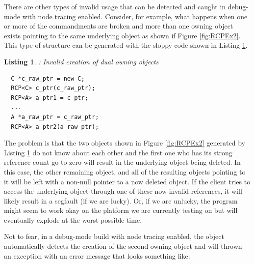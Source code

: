 \documentclass[pdf,ps2pdf,11pt]{SANDreport}
\newtheorem{listing}{Listing}
\begin{document}
There are other types of invalid usage that can be detected and caught
in debug-mode with node tracing enabled.  Consider, for example, what
happens when one or more of the commandments are broken and more than
one owning {} object exists pointing to the same
underlying {} object as shown if Figure
{}\ref{fig:RCPEx2}.  This type of structure can be generated with the
sloppy code shown in Listing {}\ref{listing:duplicate_owning_rcp}.

{}\begin{listing}: Invalid creation of dual owning {}
objects
\label{listing:duplicate_owning_rcp}
{\small\begin{verbatim}
  C *c_raw_ptr = new C;
  RCP<C> c_ptr(c_raw_ptr);
  RCP<A> a_ptr1 = c_ptr;
  ...
  A *a_raw_ptr = c_raw_ptr;
  RCP<A> a_ptr2(a_raw_ptr);
\end{verbatim}}
\end{listing}

The problem is that the two {} objects shown in
Figure {}\ref{fig:RCPEx2} generated by Listing
{}\ref{listing:duplicate_owning_rcp} do not know about each other and
the first one who has its strong reference count go to zero will
result in the underlying {} object being deleted.  In this
case, the other remaining {} object, and all of
the resulting {} objects pointing to it will be left with
a non-null pointer to a now deleted {} object.  If the
client tries to access the underlying object through one of these now
invalid references, it will likely result in a segfault (if we are
lucky).  Or, if we are unlucky, the program might seem to work okay on
the platform we are currently testing on but will eventually explode
at the worst possible time.

Not to fear, in a debug-mode build with node tracing enabled, the
{} object automatically detects the creation of
the second owning {} object and will thrown an
exception with an error message that looks something like:
\end{document}
